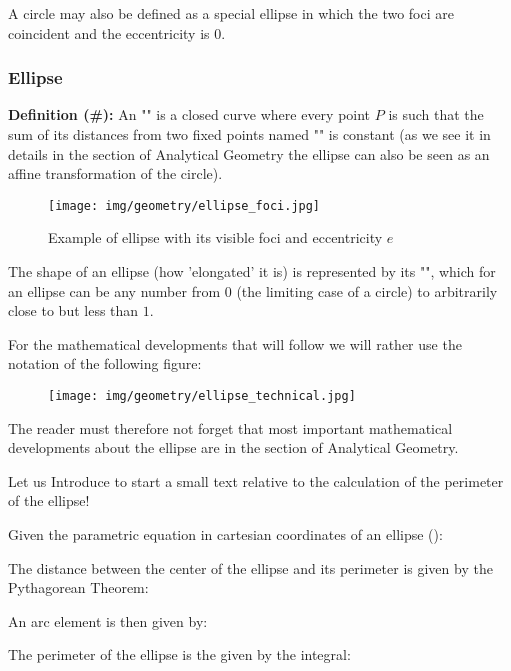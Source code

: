 {		\begin{tcolorbox}[title=Remark,colframe=black,arc=10pt]
	A circle may also be defined as a special ellipse in which the two foci are coincident and the eccentricity is $0$.
		\end{tcolorbox}
	
	\subsubsection{Ellipse}
	\textbf{Definition (\#\mydef):} An "" is a closed curve where every point $P$ is such that the sum of its distances from two fixed points named "" is constant (as we see it in details in the section of Analytical Geometry the ellipse can also be seen as an affine transformation of the circle).
	\begin{figure}[H]
		\centering
		\texttt{[image: img/geometry/ellipse\_foci.jpg]}
		\caption{Example of ellipse with its visible foci and eccentricity $e$}
	\end{figure}
	The shape of an ellipse (how 'elongated' it is) is represented by its "", which for an ellipse can be any number from $0$ (the limiting case of a circle) to arbitrarily close to but less than $1$.
	
	For the mathematical developments that will follow we will rather use the notation of the following figure:
	\begin{figure}[H]
		\centering
		\texttt{[image: img/geometry/ellipse\_technical.jpg]}
	\end{figure}
	\begin{tcolorbox}[title=Remark,colframe=black,arc=10pt]
	The reader must therefore not forget that most important mathematical developments about the ellipse are in the section of Analytical Geometry.
	\end{tcolorbox}
	Let us Introduce to start a small text relative to the calculation of the perimeter of the ellipse!
	
	Given the parametric equation in cartesian coordinates of an ellipse ():
	
	The distance between the center of the ellipse and its perimeter is given by the Pythagorean Theorem:
	
	An arc element is then given by:
	
	The perimeter of the ellipse is the given by the integral:
	
}
